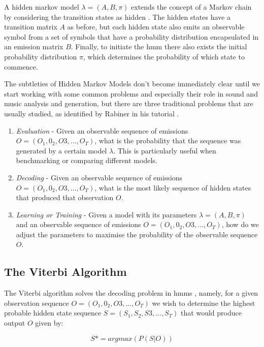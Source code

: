 {{{{{{{A hidden markov model $\lambda = (A, B, \pi)$ extends the concept of a Markov chain by considering the transition states as hidden \citep{Rabiner1989}. The hidden states have a  transition matrix $A$ as before, but each hidden state also emits an observable symbol from a set of symbols that have a probability distribution encapsulated in an emission matrix $B$. Finally, to initiate the \acrshort{hmm} there also exists the initial probability distribution $\pi$, which determines the probability of which state to commence. 

The subtleties of Hidden Markov Models don’t become immediately clear until we start working with some common problems and especially their role in sound and music analysis and generation, but there are three traditional problems that are usually studied, as identified by Rabiner in his tutorial \citeyearpar{Rabiner1989}.

\begin{enumerate}
  \item \textit{Evaluation}  - Given an observable sequence of emissions $O = (O_1, 0_2, O3,..., O_T)$, what is the probability that the sequence was generated by a certain model $\lambda$. This is particularly useful when benchmarking or comparing different models. 

\item \textit{Decoding} - Given an observable sequence of emissions $O = (O_1, 0_2, O3,..., O_T)$, what is the most likely sequence of hidden states that produced that observation $O$.

\item \textit{Learning or Training} - Given a model with its parameters $\lambda = (A, B, \pi)$ and an observable sequence of emissions $O = (O_1, 0_2, O3,..., O_T)$, how do we adjust the parameters to maximise the probability of the observable sequence $O$.
\end{enumerate}

\subsection{The Viterbi Algorithm}

The Viterbi algorithm solves the decoding problem in \acrshort{hmm}s \citep{Rabiner1989}, namely, for a given observation sequence $O = (O_1, 0_2, O3,..., O_T)$  we wish to determine the highest probable hidden state sequence $S = (S_1, S_2, S3,..., S_T)$ that would produce output $O$ given by:

\begin{equation}
\label{eq:Precision}	
S*=argmax (P(S|O))
\end{equation}  

}}}}}}}
